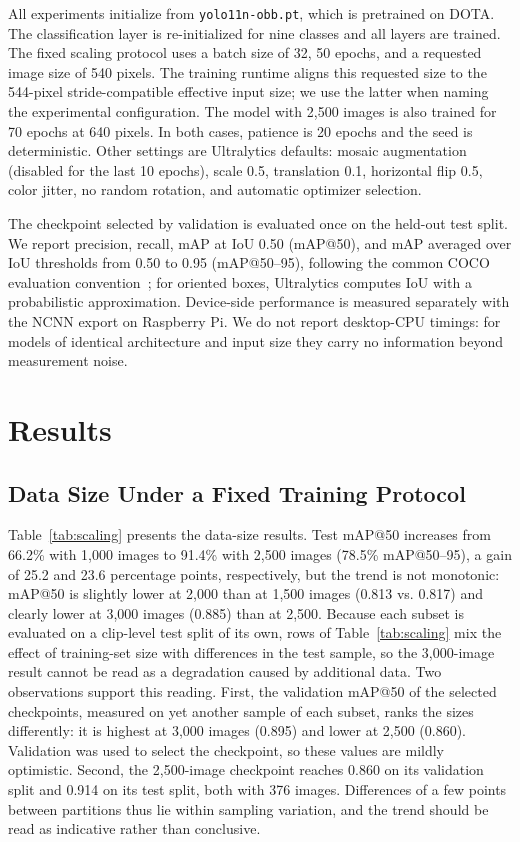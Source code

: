 \documentclass[runningheads]{llncs}
\begin{document}
All experiments initialize from \texttt{yolo11n-obb.pt}, which is pretrained on
DOTA. The classification layer is re-initialized for nine classes and all
layers are trained. The fixed scaling protocol uses a batch size of 32,
50 epochs, and a requested image size of 540 pixels. The training runtime aligns
this requested size to the 544-pixel stride-compatible effective input size;
we use the latter when naming the experimental configuration. The model with
2,500 images is also trained for 70 epochs at 640 pixels. In both cases,
patience is 20 epochs and the seed is deterministic. Other settings are
Ultralytics defaults: mosaic augmentation (disabled for the last 10 epochs),
scale 0.5, translation 0.1, horizontal flip 0.5, color jitter, no random
rotation, and automatic optimizer selection.

The checkpoint selected by validation is evaluated once on the held-out test
split. We report precision, recall, mAP at IoU 0.50 (mAP@50), and mAP averaged
over IoU thresholds from 0.50 to 0.95 (mAP@50--95), following the common COCO
evaluation convention~\cite{lin2014coco}; for oriented boxes, Ultralytics
computes IoU with a probabilistic approximation. Device-side performance is
measured separately with the NCNN export on Raspberry Pi. We do not report
desktop-CPU timings: for models of identical architecture and input size they
carry no information beyond measurement noise.

\section{Results}

\subsection{Data Size Under a Fixed Training Protocol}

Table~\ref{tab:scaling} presents the data-size results. Test mAP@50 increases
from 66.2\% with 1,000 images to 91.4\% with 2,500 images (78.5\% mAP@50--95),
a gain of 25.2 and 23.6 percentage points, respectively, but the trend is not
monotonic: mAP@50 is slightly lower at 2,000 than at 1,500 images (0.813 vs.
0.817) and clearly lower at 3,000 images (0.885) than at 2,500. Because each
subset is evaluated on a clip-level test split of its own, rows of
Table~\ref{tab:scaling} mix the effect of training-set size with differences in
the test sample, so the 3,000-image result cannot be read as a degradation
caused by additional data. Two observations support this reading. First, the
validation mAP@50 of the selected checkpoints, measured on yet another sample of
each subset, ranks the sizes differently: it is highest at 3,000 images (0.895)
and lower at 2,500 (0.860). Validation was used to select the checkpoint, so
these values are mildly optimistic. Second, the 2,500-image checkpoint reaches
0.860 on its validation split and 0.914 on its test split, both with 376 images.
Differences of a few points between partitions thus lie within sampling
variation, and the trend should be read as indicative rather than conclusive.
\end{document}
